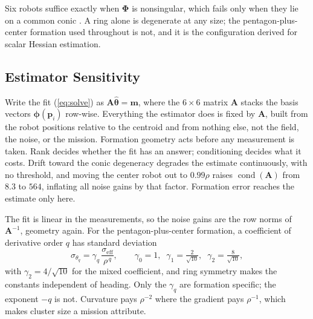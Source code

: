 \documentclass[lettersize,journal]{IEEEtran}
\begin{document}
Six robots suffice exactly when $\boldsymbol{\Phi}$ is nonsingular, which
fails only when they lie on a common conic \cite{2}. A ring alone is
degenerate at any size; the pentagon-plus-center formation used
throughout is not, and it is the configuration \cite{4} derived for
scalar Hessian estimation.

\subsection{Estimator Sensitivity}
\label{sec:sensitivity}

Write the fit (\ref{eq:solve}) as $\mathbf{A}\hat{\boldsymbol{\theta}} =
\mathbf{m}$, where the $6 \times 6$ matrix $\mathbf{A}$ stacks the basis
vectors $\boldsymbol{\phi}(\mathbf{p}_i)$ row-wise. Everything the
estimator does is fixed by $\mathbf{A}$, built from the robot positions
relative to the centroid and from nothing else, not the field, the
noise, or the mission. Formation geometry acts before any measurement is
taken. Rank decides whether the fit has an answer; conditioning decides
what it costs. Drift toward the conic degeneracy degrades the estimate
continuously, with no threshold, and moving the center
robot out to $0.99\rho$ raises $\operatorname{cond}(\mathbf{A})$ from
$8.3$ to $564$, inflating all noise gains by that factor. Formation
error reaches the estimate only here.

The fit is linear in the measurements, so the noise gains are the row
norms of $\mathbf{A}^{-1}$, geometry again. For the
pentagon-plus-center formation, a coefficient of derivative order $q$
has standard deviation
\begin{equation}
    \sigma_{\theta_q} = \gamma_q\,
    \frac{\sigma_{\mathrm{eff}}}{\rho^{\,q}},
    \qquad
    \gamma_0 = 1, \;\;
    \gamma_1 = \tfrac{2}{\sqrt{10}}, \;\;
    \gamma_2 = \tfrac{8}{\sqrt{10}},
\end{equation}
with $\gamma_2 = 4/\sqrt{10}$ for the mixed coefficient, and ring
symmetry makes the constants independent of heading. Only the $\gamma_q$
are formation specific; the exponent $-q$ is not. Curvature pays
$\rho^{-2}$ where the gradient pays $\rho^{-1}$, which makes cluster
size a mission attribute.
\end{document}
